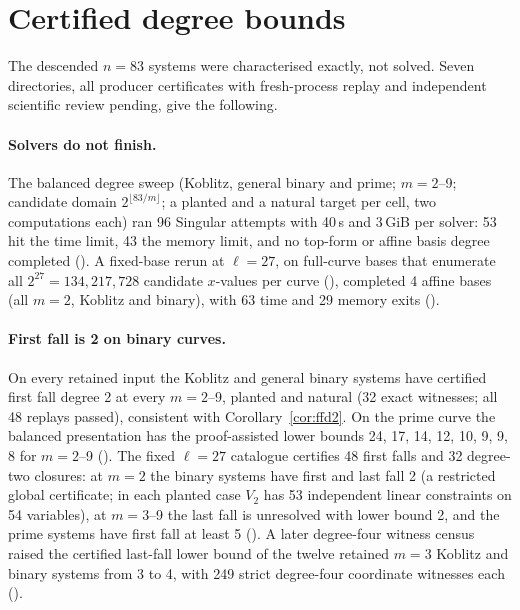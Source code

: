 \section{Certified degree bounds}\label{sec:n83l-degree}

The descended $n=83$ systems were characterised exactly, not solved. Seven
directories, all producer certificates with fresh-process replay and
independent scientific review pending, give the following.

\paragraph{Solvers do not finish.} The balanced degree sweep (Koblitz,
general binary and prime; $m=2$--9; candidate domain $2^{\lfloor83/m\rfloor}$;
a planted and a natural target per cell, two computations each) ran 96
Singular attempts with 40\,s and 3\,GiB per solver: 53 hit the time limit,
43 the memory limit, and no top-form or affine basis degree completed
(). A fixed-base rerun
at $\ell=27$, on full-curve bases that enumerate all $2^{27}=134{,}217{,}728$
candidate $x$-values per curve
(), completed 4
affine bases (all $m=2$, Koblitz and binary), with 63 time and 29 memory
exits ().

\paragraph{First fall is 2 on binary curves.} On every retained input the
Koblitz and general binary systems have certified first fall degree 2 at
every $m=2$--9, planted and natural (32 exact witnesses; all 48 replays
passed), consistent with Corollary~\ref{cor:ffd2}. On
the prime curve the balanced presentation has the proof-assisted lower
bounds 24, 17, 14, 12, 10, 9, 9, 8 for $m=2$--9
(). The fixed
$\ell=27$ catalogue certifies 48 first falls and 32 degree-two closures: at
$m=2$ the binary systems have first and last fall 2 (a restricted global
certificate; in each planted case $V_2$ has 53 independent linear
constraints on 54 variables), at $m=3$--9 the last fall is unresolved with
lower bound 2, and the prime systems have first fall at least 5
(). A later
degree-four witness census raised the certified last-fall lower bound of
the twelve retained $m=3$ Koblitz and binary systems from 3 to 4, with 249
strict degree-four coordinate witnesses each
().

